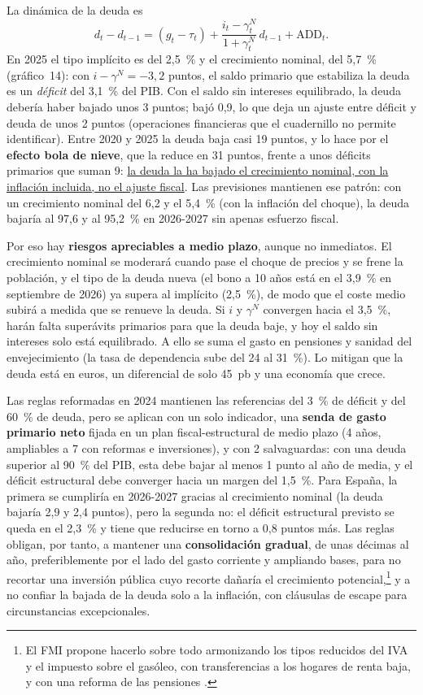 \begin{examen}
La dinámica de la deuda es
\[
d_t-d_{t-1}=(g_t-\tau_t)+\frac{i_t-\gamma^N_t}{1+\gamma^N_t}\,d_{t-1}+\mathrm{ADD}_t .
\]
En 2025 el tipo implícito es del 2,5~\% y el crecimiento nominal, del 5,7~\% (gráfico~14): con $i-\gamma^N=-3{,}2$ puntos, el saldo primario que estabiliza la deuda es un \emph{déficit} del 3,1~\% del PIB. Con el saldo sin intereses equilibrado, la deuda debería haber bajado unos 3 puntos; bajó 0,9, lo que deja un ajuste entre déficit y deuda de unos 2 puntos (operaciones financieras que el cuadernillo no permite identificar). Entre 2020 y 2025 la deuda baja casi 19 puntos, y lo hace por el \textbf{efecto bola de nieve}, que la reduce en 31 puntos, frente a unos déficits primarios que suman 9: \uline{la deuda la ha bajado el crecimiento nominal, con la inflación incluida, no el ajuste fiscal}. Las previsiones mantienen ese patrón: con un crecimiento nominal del 6,2 y el 5,4~\% (con la inflación del choque), la deuda bajaría al 97,6 y al 95,2~\% en 2026-2027 sin apenas esfuerzo fiscal.

Por eso hay \textbf{riesgos apreciables a medio plazo}, aunque no inmediatos. El crecimiento nominal se moderará cuando pase el choque de precios y se frene la población, y el tipo de la deuda nueva (el bono a 10 años está en el 3,9~\% en septiembre de 2026) ya supera al implícito (2,5~\%), de modo que el coste medio subirá a medida que se renueve la deuda. Si $i$ y $\gamma^N$ convergen hacia el 3,5~\%, harán falta superávits primarios para que la deuda baje, y hoy el saldo sin intereses solo está equilibrado. A ello se suma el gasto en pensiones y sanidad del envejecimiento (la tasa de dependencia sube del 24 al 31~\%). Lo mitigan que la deuda está en euros, un diferencial de solo 45~pb y una economía que crece.

Las reglas reformadas en 2024 mantienen las referencias del 3~\% de déficit y del 60~\% de deuda, pero se aplican con un solo indicador, una \textbf{senda de gasto primario neto} fijada en un plan fiscal-estructural de medio plazo (4 años, ampliables a 7 con reformas e inversiones), y con 2 salvaguardas: con una deuda superior al 90~\% del PIB, esta debe bajar al menos 1 punto al año de media, y el déficit estructural debe converger hacia un margen del 1,5~\%. Para España, la primera se cumpliría en 2026-2027 gracias al crecimiento nominal (la deuda bajaría 2,9 y 2,4 puntos), pero la segunda no: el déficit estructural previsto se queda en el 2,3~\% y tiene que reducirse en torno a 0,8 puntos más. Las reglas obligan, por tanto, a mantener una \textbf{consolidación gradual}, de unas décimas al año, preferiblemente por el lado del gasto corriente y ampliando bases, para no recortar una inversión pública cuyo recorte dañaría el crecimiento potencial,\footnote{El FMI propone hacerlo sobre todo armonizando los tipos reducidos del IVA y el impuesto sobre el gasóleo, con transferencias a los hogares de renta baja, y con una reforma de las pensiones .} y a no confiar la bajada de la deuda solo a la inflación, con cláusulas de escape para circunstancias excepcionales.
\end{examen}

